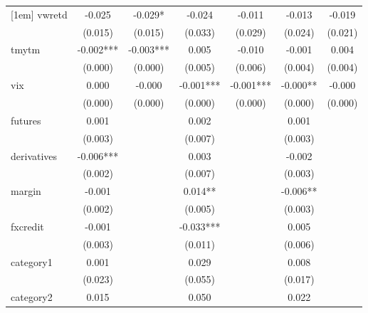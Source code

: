 {\begin{tabular}{l*{6}{c}}
[1em]
vwretd      &      -0.025   &      -0.029*  &      -0.024   &      -0.011   &      -0.013   &      -0.019   \\
            &     (0.015)   &     (0.015)   &     (0.033)   &     (0.029)   &     (0.024)   &     (0.021)   \\
[1em]
tmytm       &      -0.002***&      -0.003***&       0.005   &      -0.010   &      -0.001   &       0.004   \\
            &     (0.000)   &     (0.000)   &     (0.005)   &     (0.006)   &     (0.004)   &     (0.004)   \\
[1em]
vix         &       0.000   &      -0.000   &      -0.001***&      -0.001***&      -0.000** &      -0.000   \\
            &     (0.000)   &     (0.000)   &     (0.000)   &     (0.000)   &     (0.000)   &     (0.000)   \\
[1em]
futures     &       0.001   &               &       0.002   &               &       0.001   &               \\
            &     (0.003)   &               &     (0.007)   &               &     (0.003)   &               \\
[1em]
derivatives &      -0.006***&               &       0.003   &               &      -0.002   &               \\
            &     (0.002)   &               &     (0.007)   &               &     (0.003)   &               \\
[1em]
margin      &      -0.001   &               &       0.014** &               &      -0.006** &               \\
            &     (0.002)   &               &     (0.005)   &               &     (0.003)   &               \\
[1em]
fxcredit    &      -0.001   &               &      -0.033***&               &       0.005   &               \\
            &     (0.003)   &               &     (0.011)   &               &     (0.006)   &               \\
[1em]
category1   &       0.001   &               &       0.029   &               &       0.008   &               \\
            &     (0.023)   &               &     (0.055)   &               &     (0.017)   &               \\
[1em]
category2   &       0.015   &               &       0.050   &               &       0.022   &               \\

\end{tabular}}
